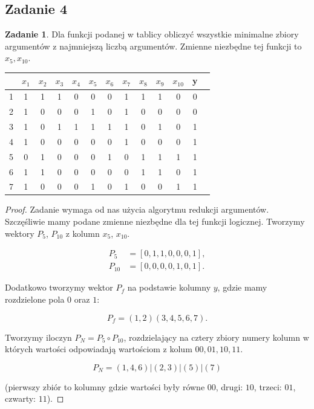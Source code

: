 \documentclass[11pt]{article}
\theoremstyle{definition}
\newtheorem{zadanie}{Zadanie}
\begin{document}
\subsection{Zadanie 4}

\begin{zadanie}
Dla funkcji podanej w tablicy obliczyć wszystkie minimalne zbiory argumentów z najmniejszą liczbą argumentów. Zmienne niezbędne tej funkcji to $x_5, x_{10}$.

\begin{table}[H]
\begin{tabular}{|c|c|c|c|c|c|c|c|c|c|c|c|c|}
\hline
 &$x_1$ & $x_2$ & $x_3$ & $x_4$ &$x_5$ &$x_6$ &$x_7$ &$x_8$ &$x_9$ &$x_{10}$  & y  \\
 \hline  1&1&1&1&0&0&0&1&1&1&0&0  \\
 \hline  2&1&0&0&0&1&0&1&0&0&0&0  \\
 \hline  3&1&0&1&1&1&1&1&0&1&0&1  \\
 \hline  4&1&0&0&0&0&0&1&0&0&0&1  \\
 \hline  5&0&1&0&0&0&1&0&1&1&1&1  \\
 \hline  6&1&1&0&0&0&0&0&1&1&0&1  \\
 \hline  7&1&0&0&0&1&0&1&0&0&1&1 \\
 \hline
\end{tabular}
\end{table}

\begin{proof}
Zadanie wymaga od nas użycia algorytmu redukcji argumentów. Szczęśliwie mamy podane zmienne niezbędne dla tej funkcji logicznej. Tworzymy wektory $P_5$, $P_{10}$ z kolumn $x_5$, $x_{10}$.

\begin{align*}
P_5 &= [0,1,1,0,0,0,1],\\
P_{10} &= [0,0,0,0,1,0,1].
\end{align*}

Dodatkowo tworzymy wektor $P_f$ na podstawie kolumny $y$, gdzie mamy rozdzielone pola $0$ oraz $1$:

$$P_f = (1,2)(3,4,5,6,7).$$

Tworzymy iloczyn $P_N = P_5\circ P_{10}$, rozdzielający na cztery zbiory numery kolumn w których wartości odpowiadają wartościom z kolum $00, 01, 10, 11$.

$$P_N = (1,4,6) | (2,3) | (5) | (7)$$

(pierwszy zbiór to kolumny gdzie wartości były równe $00$, drugi: $10$, trzeci: $01$, czwarty: $11$).


\end{proof}
\end{zadanie}
\end{document}
